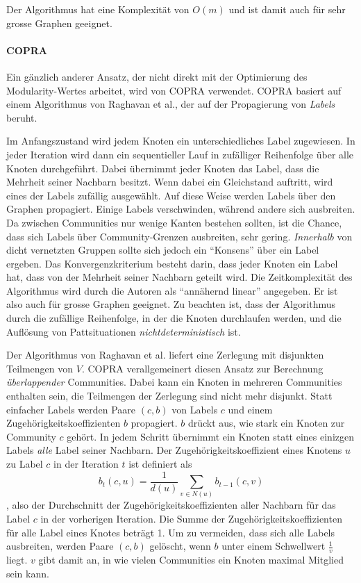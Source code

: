 Der Algorithmus hat eine Komplexit\"at von $O(m)$ und ist damit auch
f\"ur sehr grosse Graphen geeignet.

\paragraph{COPRA}
\label{sec:copra}

Ein g\"anzlich anderer Ansatz, der nicht direkt mit der Optimierung
des Modularity-Wertes arbeitet, wird von COPRA\cite{Gregory2010}
verwendet. COPRA basiert auf einem Algorithmus von Raghavan et
al.\cite{Raghavan2007}, der auf der Propagierung von \emph{Labels}
beruht. 

Im Anfangszustand wird jedem Knoten ein unterschiedliches Label
zugewiesen. In jeder Iteration wird dann ein sequentieller Lauf in
zuf\"alliger Reihenfolge \"uber alle Knoten durchgef\"uhrt. Dabei
\"ubernimmt jeder Knoten das Label, dass die Mehrheit seiner Nachbarn
besitzt. Wenn dabei ein Gleichstand auftritt, wird eines der Labels
zuf\"allig ausgew\"ahlt. Auf diese Weise werden Labels \"uber den
Graphen propagiert. Einige Labels verschwinden, w\"ahrend andere sich
ausbreiten. Da zwischen Communities nur wenige Kanten bestehen
sollten, ist die Chance, dass sich Labels \"uber Community-Grenzen
ausbreiten, sehr gering. \emph{Innerhalb} von dicht vernetzten Gruppen
sollte sich jedoch ein ``Konsens'' \"uber ein Label ergeben. Das
Konvergenzkriterium besteht darin, dass jeder Knoten ein Label hat,
dass von der Mehrheit seiner Nachbarn geteilt wird. Die
Zeitkomplexit\"at des Algorithmus wird durch die Autoren als
``ann\"ahernd linear'' angegeben. Er ist also auch f\"ur grosse
Graphen geeignet. Zu beachten ist, dass der Algorithmus durch die
zuf\"allige Reihenfolge, in der die Knoten durchlaufen werden, und die
Aufl\"osung von Pattsituationen \emph{nichtdeterministisch} ist.

Der Algorithmus von Raghavan et al. liefert eine Zerlegung mit
disjunkten Teilmengen von $V$. COPRA verallgemeinert diesen Ansatz zur
Berechnung \emph{\"uberlappender} Communities. Dabei kann ein Knoten
in mehreren Communities enthalten sein, die Teilmengen der Zerlegung
sind nicht mehr disjunkt. Statt einfacher Labels werden Paare $(c, b)$
von Labels $c$ und einem Zugeh\"origkeitskoeffizienten $b$
propagiert. $b$ dr\"uckt aus, wie stark ein Knoten zur Community $c$
geh\"ort. In jedem Schritt \"ubernimmt ein Knoten statt eines einizgen
Labels \emph{alle} Label seiner Nachbarn. Der
Zugeh\"origkeitskoeffizient eines Knotens $u$ zu Label $c$ in der
Iteration $t$ ist definiert als
\begin{equation}
  \label{eq:10}
  b_t(c, u) = \frac{1}{d(u)}\sum_{v \in N(u)}b_{t-1}(c, v)
\end{equation}
, also der Durchschnitt der Zugeh\"origkeitskoeffizienten aller
Nachbarn f\"ur das Label $c$ in der vorherigen Iteration. Die Summe
der Zugeh\"origkeitskoeffizienten f\"ur alle Label eines Knotes
betr\"agt 1. Um zu vermeiden, dass sich alle Labels ausbreiten, werden
Paare $(c, b)$ gel\"oscht, wenn $b$ unter einem Schwellwert
$\frac{1}{v}$ liegt. $v$ gibt damit an, in wie vielen Communities ein
Knoten maximal Mitglied sein kann. 

